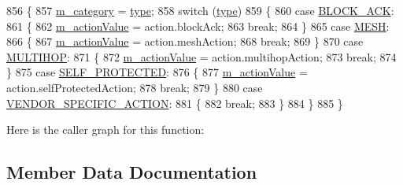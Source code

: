 \begin{DoxyCode}
856 \{
857   \hyperlink{classns3_1_1WifiActionHeader_a1e5b62e2dc8a7ad8edc62d56a2cdd866}{m\_category} = \hyperlink{visualizer-ideas_8txt_add98db9e15e2a58cf2b57623e7aa893a}{type};
858   \textcolor{keywordflow}{switch} (\hyperlink{visualizer-ideas_8txt_add98db9e15e2a58cf2b57623e7aa893a}{type})
859     \{
860     \textcolor{keywordflow}{case} \hyperlink{classns3_1_1WifiActionHeader_a5402becd11b4077f22d76c4d0d923358ae1954449580715d3d737a12739923ef2}{BLOCK\_ACK}:
861       \{
862         \hyperlink{classns3_1_1WifiActionHeader_a632dce10add5a500d2e541b975b55702}{m\_actionValue} = action.blockAck;
863         \textcolor{keywordflow}{break};
864       \}
865     \textcolor{keywordflow}{case} \hyperlink{classns3_1_1WifiActionHeader_a5402becd11b4077f22d76c4d0d923358a2324e47740ec462176e2b3dbbf50fc59}{MESH}:
866       \{
867         \hyperlink{classns3_1_1WifiActionHeader_a632dce10add5a500d2e541b975b55702}{m\_actionValue} = action.meshAction;
868         \textcolor{keywordflow}{break};
869       \}
870     \textcolor{keywordflow}{case} \hyperlink{classns3_1_1WifiActionHeader_a5402becd11b4077f22d76c4d0d923358a16a4194d2a8960fb5ec25ecd197cebf2}{MULTIHOP}:
871       \{
872         \hyperlink{classns3_1_1WifiActionHeader_a632dce10add5a500d2e541b975b55702}{m\_actionValue} = action.multihopAction;
873         \textcolor{keywordflow}{break};
874       \}
875     \textcolor{keywordflow}{case} \hyperlink{classns3_1_1WifiActionHeader_a5402becd11b4077f22d76c4d0d923358a0d41e6327b2a9ae590e3020f378e40e4}{SELF\_PROTECTED}:
876       \{
877         \hyperlink{classns3_1_1WifiActionHeader_a632dce10add5a500d2e541b975b55702}{m\_actionValue} = action.selfProtectedAction;
878         \textcolor{keywordflow}{break};
879       \}
880     \textcolor{keywordflow}{case} \hyperlink{classns3_1_1WifiActionHeader_a5402becd11b4077f22d76c4d0d923358a5eb709c107cc95e2862f5a6a341c2fe7}{VENDOR\_SPECIFIC\_ACTION}:
881       \{
882         \textcolor{keywordflow}{break};
883       \}
884     \}
885 \}
\end{DoxyCode}


Here is the caller graph for this function\+:




\subsection{Member Data Documentation}

